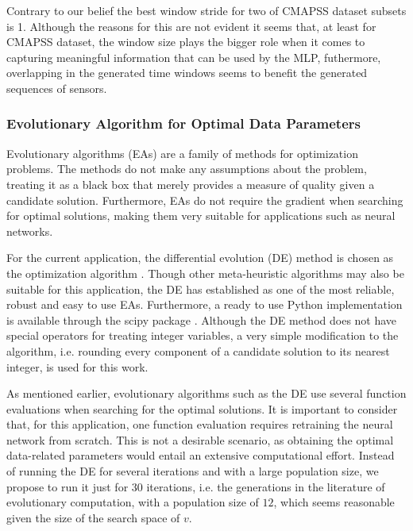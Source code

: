 \documentclass[preprint,12pt]{elsarticle}%
\begin{document}
Contrary to our belief the best window stride for two of CMAPSS dataset subsets is 1. Although the reasons for this are not evident it seems that, at least for CMAPSS dataset, the window size plays the bigger role when it comes to capturing meaningful information that can be used by the MLP, futhermore, overlapping in the generated time windows seems to benefit the generated sequences of sensors.

\subsubsection{Evolutionary Algorithm for Optimal Data Parameters}

\label{sec:ea_optimization_process}

Evolutionary algorithms (EAs) are a family of methods for optimization
problems. The methods do not make any assumptions about the problem, treating
it as a black box that merely provides a measure of quality given a candidate
solution. Furthermore, EAs do not require the gradient when searching for
optimal solutions, making them very suitable for applications such as neural networks.

For the current application, the differential evolution (DE) method is chosen
as the optimization algorithm \cite{Storn1997}. Though other meta-heuristic
algorithms may also be suitable for this application, the DE has
established as one of the most reliable, robust and easy to use EAs.
Furthermore, a ready to use Python implementation is available through the
scipy package \cite{scipy}. Although the DE method does not have special
operators for treating integer variables, a very simple modification to the
algorithm, i.e. rounding every component of a candidate solution to its
nearest integer, is used for this work.

As mentioned earlier, evolutionary algorithms such as the DE use several
function evaluations when searching for the optimal solutions. It is important to consider that, for
this application, one function evaluation requires retraining the neural
network from scratch. This is not a desirable scenario, as obtaining the
optimal data-related parameters would entail an extensive computational
effort. Instead of running the DE for several iterations and with a large
population size, we propose to run it just for $30$ iterations, i.e. the
generations in the literature of evolutionary computation, with a population
size of $12$, which seems reasonable given the size of the search space of $v$.
\end{document}
